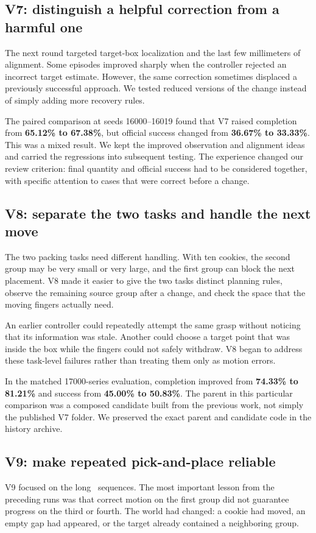 \subsection{V7: distinguish a helpful correction from a harmful one}
The next round targeted target-box localization and the last few millimeters of alignment. Some episodes improved sharply when the controller rejected an incorrect target estimate. However, the same correction sometimes displaced a previously successful approach. We tested reduced versions of the change instead of simply adding more recovery rules.

The paired comparison at seeds 16000--16019 found that V7 raised completion from \textbf{65.12\% to 67.38\%}, but official success changed from \textbf{36.67\% to 33.33\%}. This was a mixed result. We kept the improved observation and alignment ideas and carried the regressions into subsequent testing. The experience changed our review criterion: final quantity and official success had to be considered together, with specific attention to cases that were correct before a change.

\subsection{V8: separate the two tasks and handle the next move}
The two packing tasks need different handling. With ten cookies, the second group may be very small or very large, and the first group can block the next placement. V8 made it easier to give the two tasks distinct planning rules, observe the remaining source group after a change, and check the space that the moving fingers actually need.

An earlier controller could repeatedly attempt the same grasp without noticing that its information was stale. Another could choose a target point that was inside the box while the fingers could not safely withdraw. V8 began to address these task-level failures rather than treating them only as motion errors.

In the matched 17000-series evaluation, completion improved from \textbf{74.33\% to 81.21\%} and success from \textbf{45.00\% to 50.83\%}. The parent in this particular comparison was a composed candidate built from the previous work, not simply the published V7 folder. We preserved the exact parent and candidate code in the history archive.

\subsection{V9: make repeated pick-and-place reliable}
V9 focused on the long \pTen\ sequences. The most important lesson from the preceding runs was that correct motion on the first group did not guarantee progress on the third or fourth. The world had changed: a cookie had moved, an empty gap had appeared, or the target already contained a neighboring group.

